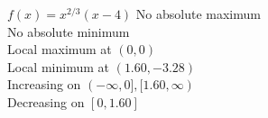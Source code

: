 {$f(x) = x^{2/3}(x - 4)$}
{ No absolute maximum \\
No absolute minimum \\
Local maximum at $(0, 0)$ \\
Local minimum at $(1.60, -3.28)$\\
Increasing on $(-\infty, 0], [1.60, \infty)$\\
Decreasing on $[0, 1.60]$}